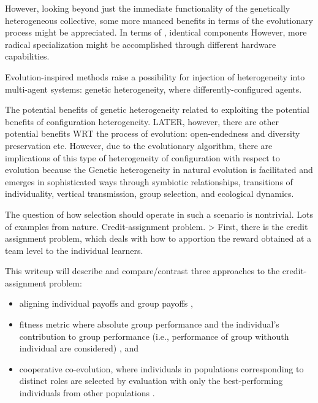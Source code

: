 However, looking beyond just the immediate functionality of the genetically heterogeneous collective, some more nuanced benefits in terms of the evolutionary process might be appreciated.
In terms of , identical components
However, more radical specialization might be accomplished through different hardware capabilities.

Evolution-inspired methods raise a possibility for injection of heterogeneity into multi-agent systems: genetic heterogeneity, where differently-configured agents.

The potential benefits of genetic heterogeneity related to exploiting the potential benefits of configuration heterogeneity.
LATER, however, there are other potential benefits WRT the process of evolution: open-endedness and diversity preservation etc.
However, due to the evolutionary algorithm, there are implications of this type of heterogeneity of configuration with respect to evolution because the
Genetic heterogeneity in natural evolution is facilitated and emerges in sophisticated ways through symbiotic relationships, transitions of individuality, vertical transmission, group selection, and ecological dynamics.

The question of how selection should operate in such a scenario is nontrivial.
Lots of examples from nature.
Credit-assignment problem.
> First, there is the credit assignment problem, which deals with how to apportion the reward obtained at a team level to the individual learners. \cite{panait2005cooperative}

This writeup will describe and compare/contrast three approaches to the credit-assignment problem:
\begin{itemize}
  \item aligning individual payoffs and group payoffs \cite{waibel2009genetic},
  \item fitness metric where absolute group performance and the individual's contribution to group performance (i.e., performance of group withouth individual are considered) \cite{knudson2010coevolution}, and
  \item cooperative co-evolution, where individuals in populations corresponding to distinct roles are selected by evaluation with only the best-performing individuals from other populations \cite{gomes2015cooperative}.
\end{itemize}
